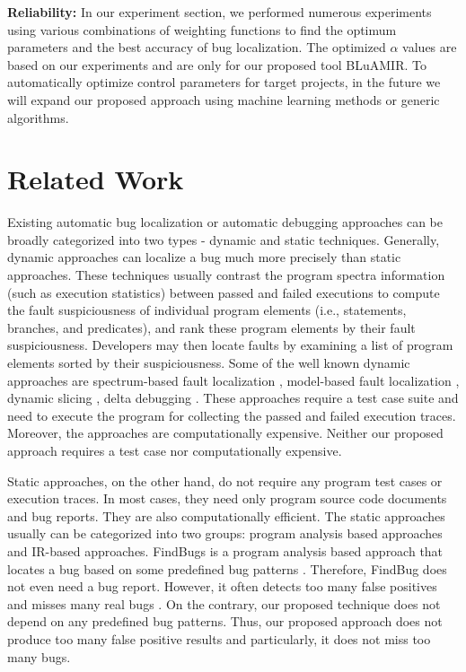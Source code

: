 \documentclass[conference]{IEEEtran}
\begin{document}
\textbf{Reliability:}
In our experiment section, we performed numerous experiments using various combinations of weighting functions to find the optimum parameters and the best accuracy of bug localization. The optimized $\alpha$ values are based on our experiments and are only for our proposed tool BLuAMIR. To automatically optimize control parameters for target projects, in the future we will expand our proposed approach using machine learning methods or generic algorithms.

\section{Related Work}\label{relatedwork}
Existing automatic bug localization or automatic debugging approaches can be broadly categorized into two types - dynamic and static techniques. Generally, dynamic approaches can localize a bug much more precisely than static approaches. These techniques usually contrast the program spectra information (such as execution statistics) between passed and failed executions to compute the fault suspiciousness of individual program elements (i.e., statements, branches, and predicates), and rank these program elements by their fault suspiciousness. Developers may then locate faults by examining a list of program elements sorted by their suspiciousness. Some of the well known dynamic approaches are spectrum-based fault localization \cite{Abreu,Jones,Lucia,SahaFault}, model-based fault localization \cite{Feldman,Mayer}, dynamic slicing \cite{Zhang:2005}, delta debugging \cite{Zeller:2002}. These approaches require a test case suite and need to execute the program for collecting the passed and failed execution traces. Moreover, the approaches are computationally expensive. Neither our proposed approach requires a test case nor computationally expensive.

Static approaches, on the other hand, do not require any program test cases or execution traces. In most cases, they need only program source code documents and bug reports. They are also computationally efficient. The static approaches usually can be categorized into two groups: program analysis based approaches and IR-based approaches. FindBugs is a program analysis based approach that locates a bug based on some predefined bug patterns \cite{FindBug}. 
Therefore, FindBug does not even need a bug report. However, it often detects too many false positives and misses many real bugs \cite{Tang}. On the contrary, our proposed technique does not depend on any predefined bug patterns. Thus, our proposed approach does not produce too many false positive results and particularly, it does not miss too many bugs. 
\end{document}
